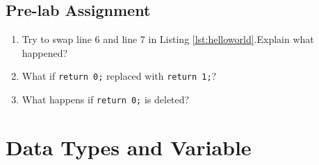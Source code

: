 \begin{itemize}
\end{itemize}
\subsection{Pre-lab Assignment}
\begin{enumerate}
	\item Try to swap line 6 and line 7 in Listing \ref{lst:helloworld}.Explain what happened?
	\item What if \verb|return 0;| replaced with \verb|return 1;|?
	\item What happens if \verb|return 0;| is deleted?
\end{enumerate}


\section{Data Types and Variable}
